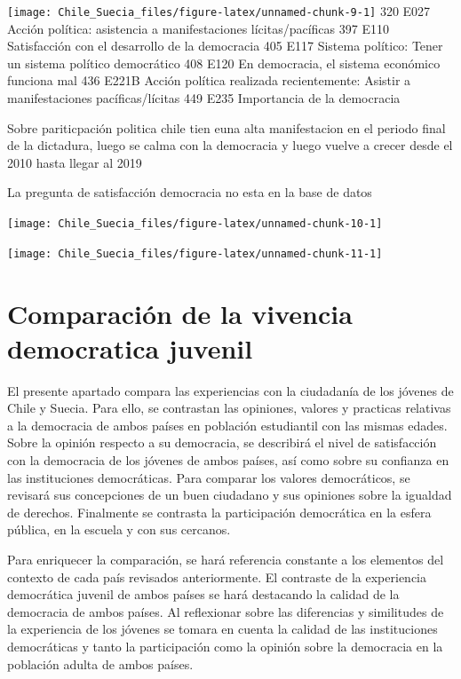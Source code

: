 \documentclass[12pt,twoside]{templates/facsothesis}
\begin{document}
\texttt{[image: Chile\_Suecia\_files/figure-latex/unnamed-chunk-9-1]}
320 E027 Acción política: asistencia a manifestaciones lícitas/pacíficas
397 E110 Satisfacción con el desarrollo de la democracia
405 E117 Sistema político: Tener un sistema político democrático
408 E120 En democracia, el sistema económico funciona mal
436 E221B Acción política realizada recientemente: Asistir a manifestaciones pacíficas/lícitas
449 E235 Importancia de la democracia

Sobre pariticpación politica chile tien euna alta manifestacion en el periodo final de la dictadura, luego se calma con la democracia y luego vuelve a crecer desde el 2010 hasta llegar al 2019

La pregunta de satisfacción democracia no esta en la base de datos

\texttt{[image: Chile\_Suecia\_files/figure-latex/unnamed-chunk-10-1]}

\texttt{[image: Chile\_Suecia\_files/figure-latex/unnamed-chunk-11-1]}

\hypertarget{comparaciuxf3n-de-la-vivencia-democratica-juvenil}{%
\chapter{Comparación de la vivencia democratica juvenil}\label{comparaciuxf3n-de-la-vivencia-democratica-juvenil}}

El presente apartado compara las experiencias con la ciudadanía de los jóvenes de Chile y Suecia. Para ello, se contrastan las opiniones, valores y practicas relativas a la democracia de ambos países en población estudiantil con las mismas edades. Sobre la opinión respecto a su democracia, se describirá el nivel de satisfacción con la democracia de los jóvenes de ambos países, así como sobre su confianza en las instituciones democráticas. Para comparar los valores democráticos, se revisará sus concepciones de un buen ciudadano y sus opiniones sobre la igualdad de derechos. Finalmente se contrasta la participación democrática en la esfera pública, en la escuela y con sus cercanos.

Para enriquecer la comparación, se hará referencia constante a los elementos del contexto de cada país revisados anteriormente. El contraste de la experiencia democrática juvenil de ambos países se hará destacando la calidad de la democracia de ambos países. Al reflexionar sobre las diferencias y similitudes de la experiencia de los jóvenes se tomara en cuenta la calidad de las instituciones democráticas y tanto la participación como la opinión sobre la democracia en la población adulta de ambos países.
\end{document}
